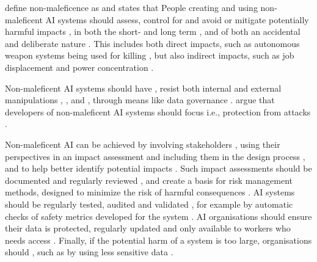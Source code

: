 \textcite[p.~6]{Doorn_2021} define non-maleficence as  and states that  People creating and using non-maleficent AI systems should assess, control for and avoid or mitigate potentially harmful impacts \parencites{Buhmann_2021,Fjeld_2020}, in both the short- and long term \parencite[p.~416]{Clarke_2019}, and of both an accidental and deliberate nature \parencite[p.~697]{Floridi_2018}. This includes both direct impacts, such as autonomous weapon systems being used for killing \parencite{Eitel-Porter_2021}, but also indirect impacts, such as job displacement \parencite[p.~12]{Gupta_2021} and power concentration \parencite[p.~11]{Jobin_2019}.

Non-maleficent AI systems should have  \parencite[p.~416]{Clarke_2019}, resist both internal and external manipulations \parencite{Fjeld_2020,Rothenberger_2019},  \parencite[p.~13]{Jobin_2019}, and  \parencite[p.~2]{Buhmann_2021}, through means like data governance \parencite{Werder_2022}. \textcite[p.~13]{Anagnostou_2022} argue that developers of non-maleficent AI systems should focus  i.e., protection from attacks \parencite[p.~70]{Ryan_2021}. 

Non-maleficent AI can be achieved by involving stakeholders \parencite{Jobin_2019,Dignum_2021}, using their perspectives in an impact assessment and including them in the design process \parencite[p.~416]{Clarke_2019}, and to help better identify potential impacts \parencite{Havrda_2020}. Such impact assessments should be documented and regularly reviewed \parencite[p.~70]{Ryan_2021}, and create a basis for risk management methods, designed to minimize the risk of harmful consequences \parencite{Buhmann_2021,Clarke_2019,Brand_2022}. AI systems should be regularly tested, audited and validated \parencite{Jobin_2019,Fjeld_2020,vanBruxvoort_2021}, for example by automatic checks of safety metrics developed for the system  \parencite{Havrda_2020}. AI organisations should ensure their data is protected, regularly updated and only available to workers who needs access \parencite{vanBruxvoort_2021,Mikalef_2022}. Finally, if the potential harm of a system is too large, organisations should  \parencite[p.~419]{Clarke_2019}, such as by using less sensitive data \parencite[p.~10]{vanBruxvoort_2021}.


